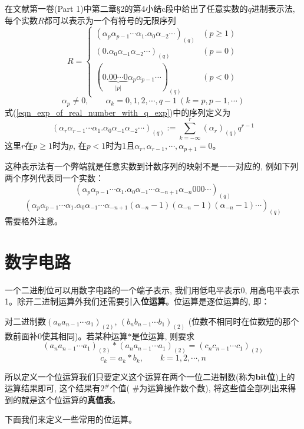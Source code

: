 \par 在文献\cite{Zorich:MA}第一卷(Part 1)中第二章\S 2的第4小结c段中给出了任意实数的$q$进制表示法, 每个实数$R$都可以表示为一个有符号的无限序列
\begin{equation}\label{eqn_exp_of_real_number_with_q_exp}
    R=\begin{cases}
        (\alpha_p\alpha_{p-1}\cdots\alpha_1.\alpha_{0}\alpha_{-2}\cdots)_{(q)}&(p\geq 1)\\
        (0.\alpha_0\alpha_{-1}\alpha_{-2}\cdots)_{(q)}&(p=0)\\
        (0.\underbrace{00\cdots 0}_{|p|}\alpha_p\alpha_{p-1}\cdots)_{(q)}&(p<0)
    \end{cases}
\end{equation}
$$\alpha_p\neq 0,\qquad\alpha_k=0,1,2,\cdots,q-1\ (k=p,p-1,\cdots)$$
式(\ref{eqn_exp_of_real_number_with_q_exp})中的序列定义为
$$(\alpha_r\alpha_{r-1}\cdots\alpha_1.\alpha_0\alpha_{-1}\alpha_{-2}\cdots)_{(q)}:=\sum_{k=-\infty}^r\left(\alpha_r\right)_{(q)} q^{r-1}$$
这里$r$在$p\geq 1$时为$p$, 在$p<1$时为$1$且$\alpha_r,\alpha_{r-1},\cdots,\alpha_{p+1}=0$。
\par 这种表示法有一个弊端就是任意实数到计数序列的映射不是一一对应的, 例如下列两个序列代表同一个实数：
$$\left(\alpha_p\alpha_{p-1}\cdots\alpha_{1}.\alpha_{0}\alpha_{-1}\cdots\alpha_{-n+1}\alpha_{-n}000\cdots\right)_{(q)}$$
$$\left(\alpha_p\alpha_{p-1}\cdots\alpha_{1}.\alpha_{0}\alpha_{-1}\cdots\alpha_{-n+1}(\alpha_{-n}-1)(\alpha_{-n}-1)(\alpha_{-n}-1)\cdots\right)_{(q)}$$
需要格外注意。
\section*{数字电路}
\par 一个二进制位可以用数字电路的一个端子表示, 我们用低电平表示0, 用高电平表示1。除开二进制运算外我们还需要引入\textbf{位运算}。位运算是逐位运算的, 即：
\begin{definition*}
    对二进制数$(a_na_{n-1}\cdots a_1)_{(2)}$, $(b_nb_{n-1}\cdots b_1)_{(2)}$ (位数不相同时在位数短的那个数前面补0使其相同)。若某种运算$*$是位运算, 则要求
    $$(a_na_{n-1}\cdots a_1)_{(2)}*(a_na_{n-1}\cdots a_1)_{(2)}=(c_nc_{n-1}\cdots c_1)_{(2)}$$
    $$c_k=a_k*b_k,\qquad k=1,2,\cdots,n$$
\end{definition*}
\par 所以定义一个位运算我们只要定义这个运算在两个一位二进制数(称为\textbf{bit位})上的运算结果即可, 这个结果有$2^\#$个值( $\#$为运算操作数个数), 将这些值全部列出来得到的就是这个位运算的\textbf{真值表}。
\par 下面我们来定义一些常用的位运算。

